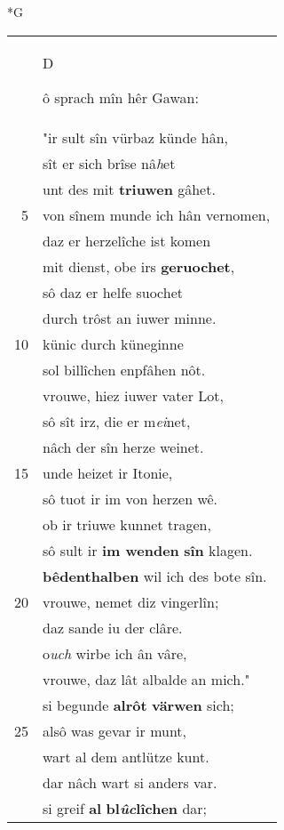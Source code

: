 \documentclass[8pt,a4paper,notitlepage]{article}
\begin{document}
\begin{table}[ht]
\begin{minipage}[t]{0.5\linewidth}
\small
\begin{center}*G
\end{center}
\begin{tabular}{rl}
 & \begin{large}D\end{large}ô sprach mîn hêr Gawan:\\ 
 & "ir sult sîn vürbaz künde hân,\\ 
 & sît er sich brîse nâ\textit{h}et\\ 
 & unt des mit \textbf{triuwen} gâhet.\\ 
5 & von sînem munde ich hân vernomen,\\ 
 & daz er herzelîche ist komen\\ 
 & mit dienst, obe irs \textbf{geruochet},\\ 
 & sô daz er helfe suochet\\ 
 & durch trôst an iuwer minne.\\ 
10 & künic durch küneginne\\ 
 & sol billîchen enpfâhen nôt.\\ 
 & vrouwe, hiez iuwer vater Lot,\\ 
 & sô sît irz, die er m\textit{ei}net,\\ 
 & nâch der sîn herze weinet.\\ 
15 & unde heizet ir Itonie,\\ 
 & sô tuot ir im von herzen wê.\\ 
 & ob ir triuwe kunnet tragen,\\ 
 & sô sult ir \textbf{im wenden} \textbf{sîn} klagen.\\ 
 & \textbf{bêdenthalben} wil ich des bote sîn.\\ 
20 & vrouwe, nemet diz vingerlîn;\\ 
 & daz sande iu der clâre.\\ 
 & o\textit{uch} wirbe ich ân vâre,\\ 
 & vrouwe, daz lât albalde an mich."\\ 
 & si begunde \textbf{alrôt} \textbf{värwen} sich;\\ 
25 & alsô was gevar ir munt,\\ 
 & wart al dem antlütze kunt.\\ 
 & dar nâch wart si anders var.\\ 
 & si greif \textbf{al} \textbf{bl\textit{ûc}lîchen} dar;\\ 

\end{tabular}
\end{minipage}
\end{table}
\end{document}
